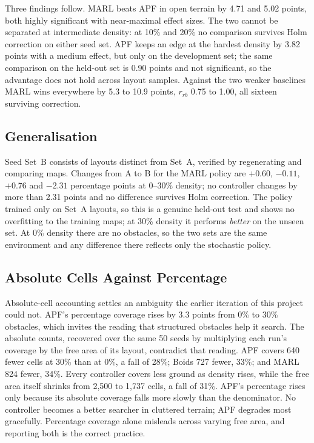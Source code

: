 \documentclass[a4paper, 10pt, conference]{ieeeconf}
\begin{document}
Three findings follow. MARL beats APF in open terrain by 4.71 and 5.02
points, both highly significant with near-maximal effect sizes. The
two cannot be separated at intermediate density: at 10\% and 20\% no
comparison survives Holm correction on either seed set. APF keeps an
edge at the hardest density by 3.82 points with a medium effect, but
only on the development set; the same comparison on the held-out set
is 0.90 points and not significant, so the advantage does not hold
across layout samples. Against the two weaker baselines MARL wins
everywhere by 5.3 to 10.9 points, $r_{rb}$ 0.75 to 1.00, all sixteen
surviving correction.

\subsection{Generalisation}\label{sec:generalisation}

Seed Set~B consists of layouts distinct from Set~A, verified by
regenerating and comparing maps. Changes from A to B for the MARL
policy are $+0.60$, $-0.11$, $+0.76$ and $-2.31$ percentage points at
0--30\% density; no controller changes by more than 2.31 points and no
difference survives Holm correction. The policy trained only on Set~A
layouts, so this is a genuine held-out test and shows no overfitting
to the training maps; at 30\% density it performs \emph{better} on the
unseen set. At 0\% density there are no obstacles, so the two sets are
the same environment and any difference there reflects only the
stochastic policy.

\subsection{Absolute Cells Against Percentage}\label{sec:absolute}


Absolute-cell accounting settles an ambiguity the earlier iteration of
this project could not. APF's percentage coverage rises by 3.3 points
from 0\% to 30\% obstacles, which invites the reading that structured
obstacles help it search. The absolute counts, recovered over the same
50 seeds by multiplying each run's coverage by the free area of its
layout, contradict that reading. APF covers 640 fewer cells at 30\%
than at 0\%, a fall of 28\%; Boids 727 fewer, 33\%; and MARL 824
fewer, 34\%. Every controller covers less ground as density rises,
while the free area itself shrinks from 2{,}500 to 1{,}737 cells, a
fall of 31\%. APF's percentage rises only because its absolute
coverage falls more slowly than the denominator. No controller becomes
a better searcher in cluttered terrain; APF degrades most gracefully.
Percentage coverage alone misleads across varying free area, and
reporting both is the correct practice.
\end{document}
